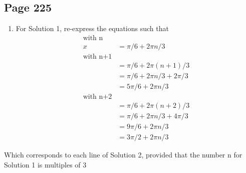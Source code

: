 \documentclass{article}
\newenvironment{solutions}[1]
{\subsection*{#1}
 \begin{enumerate}[leftmargin=1.5em]}
{\end{enumerate}}
\newcommand{\solution}{\item}
\begin{document}
\begin{solutions}{Page 225}
For $\sqrt{3}\tan x+1 =0$
\begin{align*}
    \sqrt{3}\tan x + 1 &= 0\\
    \sqrt{3} \tan x &= -1\\
    \tan x &= -1/\sqrt{3}\\
    x &= \pi n + \arctan -1/\sqrt{3}\\
    x &= \pi n + (-\pi/6)
\end{align*}

For $\tan x + 1 = 0$
\begin{align*}
    \tan x + 1 &= 0\\
    \tan x &= -1\\
    x &= \pi n + \arctan -1\\
    x &= \pi n + (-\pi/4)\\
\end{align*}
\solution

For Solution 1, re-express the equations such that
\begin{align*}
    \text{with n}\\
    x&= \pi/6 + 2\pi n/3\\
    \text{with n+1}\\
     &= \pi/6 +2\pi(n+1)/3\\
     &= \pi/6 + 2\pi n/3 + 2\pi/3\\
     &= 5\pi/6 + 2\pi n/3\\
     \text{with n+2}\\
     &= \pi/6 +2\pi(n+2)/3\\
     &= \pi/6 + 2\pi n/3 + 4\pi/3\\
     &= 9\pi/6 + 2\pi n/3\\
     &= 3\pi/2 + 2\pi n/3
\end{align*}
\end{solutions}
Which corresponds to each line of Solution 2, provided that the number n for Solution 1 is multiples of 3
\end{document}
